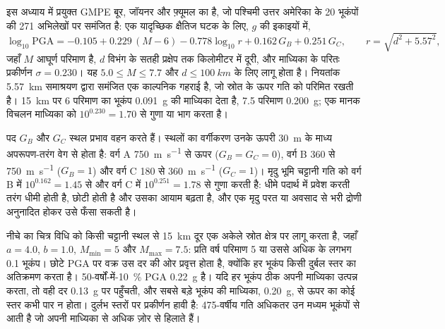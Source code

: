 इस अध्याय में प्रयुक्त GMPE बूर, जॉयनर और फ़्यूमल का है, जो पश्चिमी उत्तर अमेरिका के 20
भूकंपों की 271 अभिलेखों पर समंजित है: एक यादृच्छिक क्षैतिज घटक के लिए, $g$ की इकाइयों में,
\begin{equation}
\log_{10}\mathrm{PGA} = -0.105 + 0.229\,(M - 6) - 0.778\log_{10} r + 0.162\,G_B + 0.251\,G_C,
\qquad r = \sqrt{d^2 + 5.57^2},
\label{eq:b2:geological-hazards:gmpe}
\end{equation}
जहाँ $M$ आघूर्ण परिमाण है, $d$ विभंग के सतही प्रक्षेप तक किलोमीटर में दूरी, और माध्यिका के
परितः प्रकीर्णन $\sigma = 0.230$। यह $5.0 \leq M \leq 7.7$ और $d
\leq \qty{100}{km}$ के लिए लागू होता है। नियतांक \qty{5.57}{km} समाश्रयण द्वारा समंजित एक काल्पनिक गहराई है,
जो स्रोत के ऊपर गति को परिमित रखती है। \qty{15}{km} पर 6 परिमाण का भूकंप
\qty{0.091}{g} की माध्यिका देता है, 7.5 परिमाण \qty{0.200}{g}; एक मानक विचलन
माध्यिका को $10^{0.230} = 1.70$ से गुणा या भाग करता है।

पद $G_B$ और $G_C$ स्थल प्रभाव वहन करते हैं। स्थलों का वर्गीकरण उनके ऊपरी \qty{30}{m} के माध्य
अपरूपण-तरंग वेग से होता है: वर्ग A \qty{750}{m.s^{-1}} से ऊपर ($G_B = G_C = 0$), वर्ग B
360 से \qty{750}{m.s^{-1}} ($G_B = 1$) और वर्ग C 180 से \qty{360}{m.s^{-1}} ($G_C = 1$)। मृदु
भूमि चट्टानी गति को वर्ग B में $10^{0.162} = 1.45$ से और वर्ग C में $10^{0.251} = 1.78$ से
गुणा करती है: धीमे पदार्थ में प्रवेश करती तरंग धीमी होती है, छोटी होती है और उसका आयाम बढ़ता है, और एक
मृदु परत या अवसाद से भरी द्रोणी अनुनादित होकर उसे फँसा सकती है।

नीचे का चित्र विधि को किसी चट्टानी स्थल से \qty{15}{km} दूर एक अकेले स्रोत क्षेत्र पर लागू करता है, जहाँ $a
= 4.0$, $b = 1.0$, $M_{\min} = 5$ और $M_{\max} = 7.5$: प्रति वर्ष परिमाण 5 या उससे अधिक के लगभग 0.1
भूकंप। छोटे PGA पर वक्र उस दर की ओर प्रवृत्त होता है, क्योंकि हर भूकंप किसी दुर्बल
स्तर का अतिक्रमण करता है। 50-वर्षों-में-\qty{10}{\percent} PGA \qty{0.22}{g} है। यदि हर भूकंप ठीक
अपनी माध्यिका उत्पन्न करता, तो वही दर \qty{0.13}{g} पर पहुँचती, और सबसे बड़े भूकंप की माध्यिका,
\qty{0.20}{g}, से ऊपर का कोई स्तर कभी पार न होता। दुर्लभ स्तरों पर प्रकीर्णन
हावी है: 475-वर्षीय गति अधिकतर उन मध्यम भूकंपों से आती है जो अपनी माध्यिका से अधिक ज़ोर से
हिलाते हैं।

